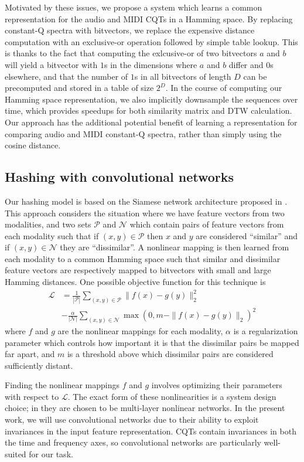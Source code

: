 \documentclass{article}
\begin{document}
Motivated by these issues, we propose a system which learns a common representation for the audio and MIDI CQTs in a Hamming space.
By replacing constant-Q spectra with bitvectors, we replace the expensive distance computation with an exclusive-or operation followed by simple table lookup.
This is thanks to the fact that computing the exlcusive-or of two bitvectors $a$ and $b$ will yield a bitvector with $1$s in the dimensions where $a$ and $b$ differ and $0$s elsewhere, and that the number of $1$s in all bitvectors of length $D$ can be precomputed and stored in a table of size $2^D$.
In the course of computing our Hamming space representation, we also implicitly downsample the sequences over time, which provides speedups for both similarity matrix and DTW calculation.
Our approach has the additional potential benefit of learning a representation for comparing audio and MIDI constant-Q spectra, rather than simply using the cosine distance.

\subsection{Hashing with convolutional networks}

Our hashing model is based on the Siamese network architecture proposed in \cite{masci2014multimodal}.
This approach considers the situation where we have feature vectors from two modalities, and two sets $\mathcal{P}$ and $\mathcal{N}$ which contain pairs of feature vectors from each modality such that if $(x, y) \in \mathcal{P}$ then $x$ and $y$ are considered ``similar'' and if $(x, y) \in \mathcal{N}$ they are ``dissimilar''.
A nonlinear mapping is then learned from each modality to a common Hamming space such that similar and dissimilar feature vectors are respectively mapped to bitvectors with small and large Hamming distances.
One possible objective function for this technique is
\begin{align*}
\mathcal{L} &= \frac{1}{|\mathcal{P}|} \sum_{(x, y) \in \mathcal{P}} \| f(x) - g(y) \|_2^2\\
& - \frac{\alpha}{|\mathcal{N}|} \sum_{(x, y) \in \mathcal{N}} \max(0, m - \|f(x) - g(y) \|_2)^2
\end{align*}
where $f$ and $g$ are the nonlinear mappings for each modality, $\alpha$ is a regularization parameter which controls how important it is that the dissimilar pairs be mapped far apart, and $m$ is a threshold above which dissimilar pairs are considered sufficiently distant.

Finding the nonlinear mappings $f$ and $g$ involves optimizing their parameters with respect to $\mathcal{L}$.
The exact form of these nonlinearities is a system design choice; in \cite{masci2014multimodal} they are chosen to be multi-layer nonlinear networks.
In the present work, we will use convolutional networks due to their ability to exploit invariances in the input feature representation.
CQTs contain invariances in both the time and frequency axes, so convolutional networks are particularly well-suited for our task.
\end{document}
